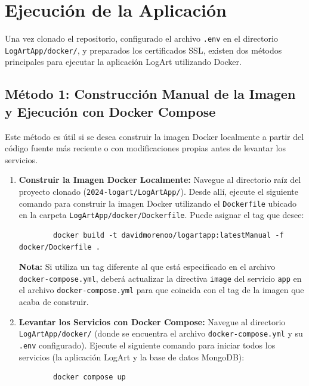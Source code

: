\section{Ejecución de la Aplicación}
\label{appA:ejecucionApp}

Una vez clonado el repositorio, configurado el archivo \texttt{.env} en el directorio \texttt{LogArtApp/docker/}, y preparados los certificados SSL, existen dos métodos principales para ejecutar la aplicación LogArt utilizando Docker.

\subsection{Método 1: Construcción Manual de la Imagen y Ejecución con Docker Compose}
\label{appA:ejecucionMetodo1}
Este método es útil si se desea construir la imagen Docker localmente a partir del código fuente más reciente o con modificaciones propias antes de levantar los servicios.
\begin{enumerate}
    \item \textbf{Construir la Imagen Docker Localmente:}
    Navegue al directorio raíz del proyecto clonado (\texttt{2024-logart/LogArtApp/}). Desde allí, ejecute el siguiente comando para construir la imagen Docker utilizando el \texttt{Dockerfile} ubicado en la carpeta \texttt{LogArtApp/docker/Dockerfile}. Puede asignar el tag que desee:
    \begin{verbatim}
        docker build -t davidmorenoo/logartapp:latestManual -f docker/Dockerfile .
    \end{verbatim}
    \textbf{Nota:} Si utiliza un tag diferente al que está especificado en el archivo \texttt{docker-compose.yml}, deberá actualizar la directiva \texttt{image} del servicio \texttt{app} en el archivo \texttt{docker-compose.yml} para que coincida con el tag de la imagen que acaba de construir.
    \item \textbf{Levantar los Servicios con Docker Compose:}
    Navegue al directorio \texttt{LogArtApp/docker/} (donde se encuentra el archivo \texttt{docker-compose.yml} y su \texttt{.env} configurado). Ejecute el siguiente comando para iniciar todos los servicios (la aplicación LogArt y la base de datos MongoDB):
    \begin{verbatim}
        docker compose up
    \end{verbatim}
\end{enumerate}

